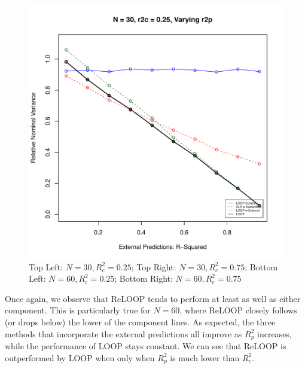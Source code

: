 \begin{figure}[H]
	\includegraphics[width=.49\linewidth,page = 4]{images/r2p.pdf} \quad
	\caption{Top Left: $N = 30, R^2_c = 0.25$; Top Right: $N = 30, R^2_c = 0.75$; Bottom Left: $N = 60, R^2_c = 0.25$; Bottom Right: $N = 60, R^2_c = 0.75$}
\end{figure}
Once again, we observe that ReLOOP tends to perform at least as well as either component. This is particularly true for $N=60$, where ReLOOP closely follows (or drops below) the lower of the component lines. As expected, the three methods that incorporate the external predictions all improve as $R^2_p$ increases, while the performance of LOOP stays constant. We can see that ReLOOP is outperformed by LOOP when only when $R^2_p$ is much lower than $R^2_c$.

